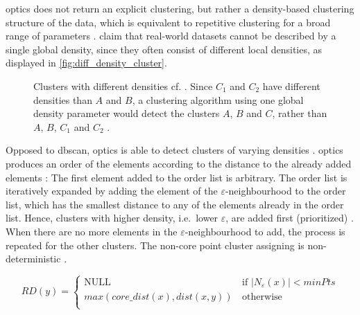 \ac{optics} does not return an explicit clustering, but rather a density-based clustering structure of the data, 
which is equivalent to repetitive clustering for a broad range of parameters \cite{OPTICS1999}.
\citeauthor{OPTICS1999} claim that real-world datasets cannot be described by a single global density, since they often consist of different local densities, 
as displayed in \autoref{fig:diff_density_cluster}.

\begin{figure}[!htp] %
    \centering
    
    \caption[Clusters with different densities]{Clusters with different densities cf. \cite{OPTICS1999}.
    Since $C_1$ and $C_2$ have different densities than $A$ and $B$, a clustering algorithm using one global density parameter 
    would detect the clusters $A$, $B$ and $C$, 
    rather than $A$, $B$, $C_1$ and $C_2$ .
    }
    \label{fig:diff_density_cluster}
\end{figure}

Opposed to \ac{dbscan}, \ac{optics} is able to detect clusters of varying densities \cite{OPTICS2014}.
\ac{optics} produces an order of the elements according to the distance to the already added elements \cite{OPTICS2014, OPTICS2013}:
The first element added to the order list is arbitrary.
The order list is iteratively expanded by adding the element of the $\varepsilon$-neighbourhood to the order list, which has the smallest distance to any of the elements already in the order list.
Hence, clusters with higher density, i.e.\ lower $\varepsilon$, are added first (prioritized) \cite{OPTICS_kMeans_2016, OPTICS1999}.
When there are no more elements in the $\varepsilon$-neighbourhood to add, the process is repeated for the other clusters.
The non-core point cluster assigning is non-deterministic \cite{OPTICS2013}.

\begin{equation}
    RD(y) = \left\{
    \begin{array}{ll}
    \textrm{NULL} & \, \textrm{if |}N_\varepsilon (x)| < minPts \\
    max(core\_dist(x), dist(x,y)) & \, \textrm{otherwise} \\
    \end{array}
    \right. 
    \label{eq:optics-reachability-distance}
\end{equation}

